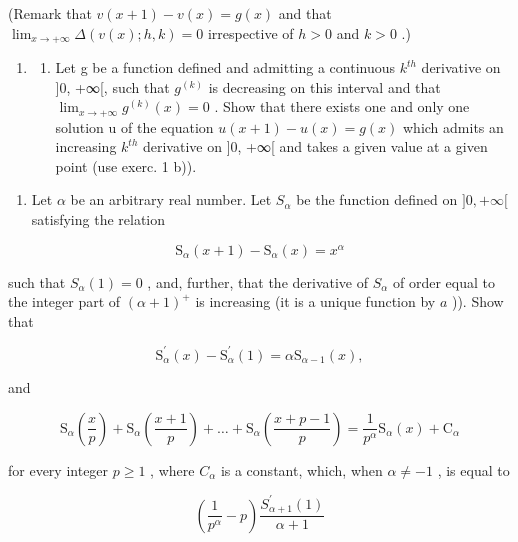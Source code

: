 (Remark that \(v(x + 1) - v(x) = g(x)\) and that \(\lim_{x\to +\infty}\Delta (v(x);h,k) = 0\) irrespective of \(h > 0\) and \(k > 0\) .)

\begin{enumerate}
\def\labelenumi{\arabic{enumi})}
\setcounter{enumi}{2}
\tightlist
\item
  \begin{enumerate}
  \def\labelenumii{\alph{enumii})}
  \tightlist
  \item
    Let g be a function defined and admitting a continuous \(k^{th}\) derivative on {]}0, +∞{[}, such that \(g^{(k)}\) is decreasing on this interval and that \(\lim_{x\to+\infty}g^{(k)}(x)=0\) . Show that there exists one and only one solution u of the equation \(u(x+1)-u(x)=g(x)\) which admits an increasing \(k^{th}\) derivative on {]}0, +∞{[} and takes a given value at a given point (use exerc. 1 b)).
  \end{enumerate}
\end{enumerate}

\begin{enumerate}
\def\labelenumi{\alph{enumi})}
\setcounter{enumi}{1}
\tightlist
\item
  Let \(\alpha\) be an arbitrary real number. Let \(S_{\alpha}\) be the function defined on \(]0, +\infty[\) satisfying the relation
\end{enumerate}

\[
\mathrm{S} _ {\alpha} (x + 1) - \mathrm{S} _ {\alpha} (x) = x ^ {\alpha}
\]

such that \(S_{\alpha}(1) = 0\) , and, further, that the derivative of \(S_{\alpha}\) of order equal to the integer part of \((\alpha + 1)^{+}\) is increasing (it is a unique function by \(a\) )). Show that

\[
\mathrm{S} _ {\alpha} ^ {\prime} (x) - \mathrm{S} _ {\alpha} ^ {\prime} (1) = \alpha \mathrm{S} _ {\alpha - 1} (x),
\]

and

\[
\mathrm{S} _ {\alpha} \left(\frac {x}{p}\right) + \mathrm{S} _ {\alpha} \left(\frac {x + 1}{p}\right) + \dots + \mathrm{S} _ {\alpha} \left(\frac {x + p - 1}{p}\right) = \frac {1}{p ^ {\alpha}} \mathrm{S} _ {\alpha} (x) + \mathrm{C} _ {\alpha}
\]

for every integer \(p \geqslant 1\) , where \(C_{\alpha}\) is a constant, which, when \(\alpha \neq -1\) , is equal to

\[
\left(\frac {1}{p ^ {\alpha}} - p\right) \frac {S _ {\alpha + 1} ^ {\prime} (1)}{\alpha + 1}
\]

